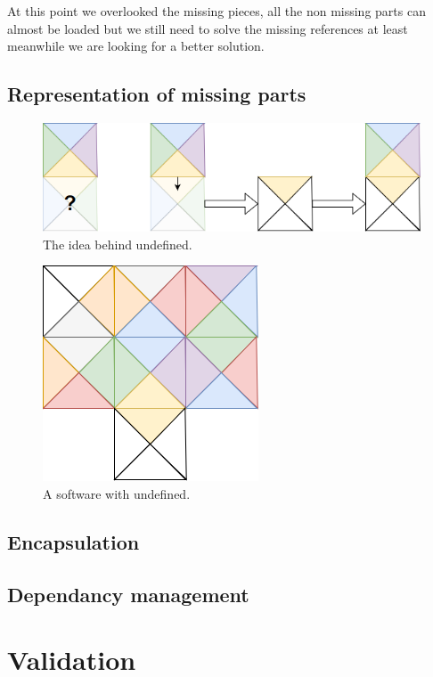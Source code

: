 \documentclass[sigplan,review,anonymous]{acmart}\settopmatter{printfolios=true,printccs=false,printacmref=false}
\begin{document}
At this point we overlooked the missing pieces, all the non missing parts can almost be loaded but we still need to solve the missing references at least meanwhile we are looking for a better solution.

\subsection{Representation of missing parts}

	\begin{figure}[H]
       \centering
       \includegraphics[scale=0.25]{Images/UndefinedExplication.png}
        \caption{The idea behind undefined.}
	\end{figure}
	
	\begin{figure}[H]
       \centering
       \includegraphics[scale=0.25]{Images/SoftWithUndefined.png}
        \caption{A software with undefined.}
	\end{figure}


\subsection{Encapsulation}
\subsection{Dependancy management}

\section{Validation}
\end{document}
